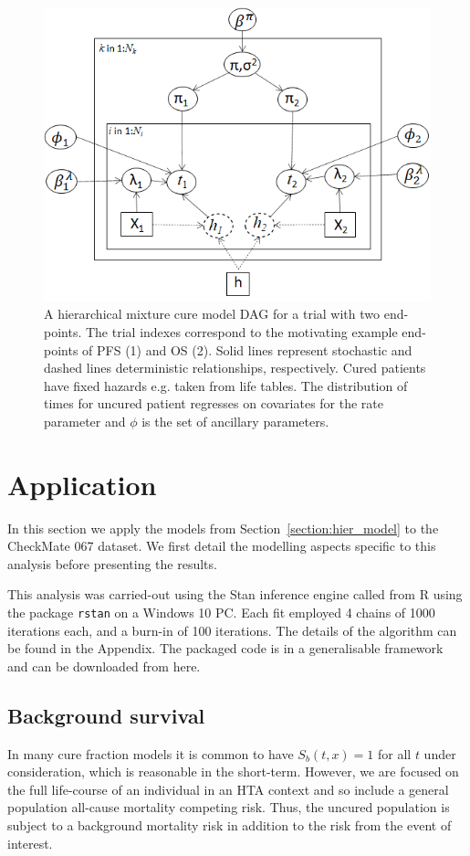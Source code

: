 \documentclass[AMA,STIX1COL]{WileyNJD-v2}
\begin{document}
\begin{figure}
\centering
\includegraphics[width=0.6\linewidth]{DAG_with_Tx.png}
\caption{\label{fig:hier_dag} A hierarchical mixture cure model DAG for a trial with two end-points. The trial indexes correspond to the motivating example end-points of PFS (1) and OS (2).
Solid lines represent stochastic and dashed lines deterministic relationships, respectively.
Cured patients have fixed hazards e.g. taken from life tables.
The distribution of times for uncured patient regresses on covariates for the rate parameter and $\phi$ is the set of ancillary parameters.}
\end{figure}

%
\section{Application}\label{sec:application}
In this section we apply the models from Section~\ref{section:hier_model} to the CheckMate 067 dataset.
We first detail the modelling aspects specific to this analysis before presenting the results.

This analysis was carried-out using the Stan inference engine \cite{carpenter2017stan} called from R \cite{Rcoreteam} using the package \texttt{rstan} on a Windows 10 PC.
Each fit employed 4 chains of 1000 iterations each, and a burn-in of 100 iterations.
The details of the algorithm can be found in the Appendix.
The packaged code is in a generalisable framework and can be downloaded from here.

%
\subsection{Background survival}
In many cure fraction models it is common to have $S_b(t, x) = 1$ for all $t$ under consideration, which is reasonable in the short-term.
However, we are focused on the full life-course of an individual in an HTA context and so include a general population all-cause mortality competing risk.
Thus, the uncured population is subject to a background mortality risk in addition to the risk from the event of interest.
\end{document}
